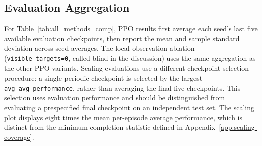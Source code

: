 \subsection{Evaluation Aggregation}
\label{app:evaluation-aggregation}
For Table~\ref{tab:all_methods_comp}, PPO results first average each seed's last five available evaluation checkpoints, then report the mean and sample standard deviation across seed averages.
The local-observation ablation (\texttt{visible\_targets=0}, called blind in the discussion) uses the same aggregation as the other PPO variants.
Scaling evaluations use a different checkpoint-selection procedure: a single periodic checkpoint is selected by the largest \texttt{avg\_avg\_performance}, rather than averaging the final five checkpoints.
This selection uses evaluation performance and should be distinguished from evaluating a prespecified final checkpoint on an independent test set.
The scaling plot displays eight times the mean per-episode average performance, which is distinct from the minimum-completion statistic defined in Appendix~\ref{app:scaling-coverage}.
